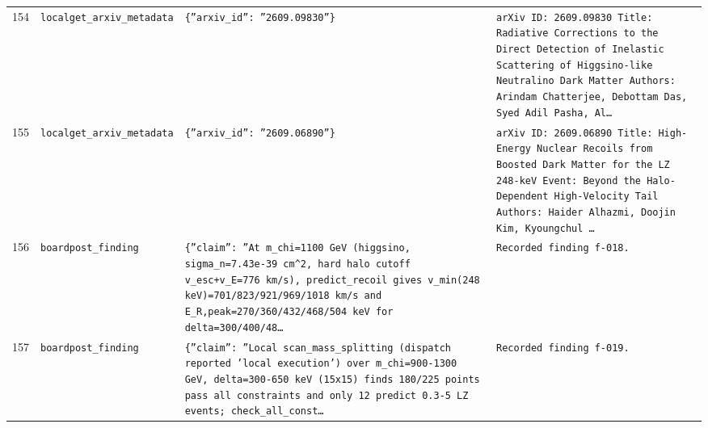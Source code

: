 \documentclass[11pt,a4paper]{article}
\begin{document}
\begin{longtable}{@{}p{}p{}p{}p{}@{}}
154 & \texttt{local}\newline\texttt{get\_\allowbreak{}arxiv\_\allowbreak{}metadata} & \texttt{\{''arxiv\_\allowbreak{}id'':\allowbreak{} ''2609.09830''\}\allowbreak{}} & \texttt{arXiv ID:\allowbreak{} 2609.09830 Title:\allowbreak{} Radiative Corrections to the Direct Detection of Inelastic Scattering of Higgsino-like Neutralino Dark Matter Authors:\allowbreak{} Arindam Chatterjee,\allowbreak{} Debottam Das,\allowbreak{} Syed Adil Pasha,\allowbreak{} Al\ldots{}\allowbreak{}} \\
155 & \texttt{local}\newline\texttt{get\_\allowbreak{}arxiv\_\allowbreak{}metadata} & \texttt{\{''arxiv\_\allowbreak{}id'':\allowbreak{} ''2609.06890''\}\allowbreak{}} & \texttt{arXiv ID:\allowbreak{} 2609.06890 Title:\allowbreak{} High-Energy Nuclear Recoils from Boosted Dark Matter for the LZ 248-keV Event:\allowbreak{} Beyond the Halo-Dependent High-Velocity Tail Authors:\allowbreak{} Haider Alhazmi,\allowbreak{} Doojin Kim,\allowbreak{} Kyoungchul \ldots{}\allowbreak{}} \\
156 & \texttt{board}\newline\texttt{post\_\allowbreak{}finding} & \texttt{\{''claim'':\allowbreak{} ''At m\_\allowbreak{}chi=\allowbreak{}1100 GeV (higgsino,\allowbreak{} sigma\_\allowbreak{}n=\allowbreak{}7.43e-39 cm\textasciicircum{}\allowbreak{}2,\allowbreak{} hard halo cutoff v\_\allowbreak{}esc+v\_\allowbreak{}E=\allowbreak{}776 km/\allowbreak{}s)\allowbreak{},\allowbreak{} predict\_\allowbreak{}recoil gives v\_\allowbreak{}min(248 keV)\allowbreak{}=\allowbreak{}701/\allowbreak{}823/\allowbreak{}921/\allowbreak{}969/\allowbreak{}1018 km/\allowbreak{}s and E\_\allowbreak{}R,\allowbreak{}peak=\allowbreak{}270/\allowbreak{}360/\allowbreak{}432/\allowbreak{}468/\allowbreak{}504 keV for delta=\allowbreak{}300/\allowbreak{}400/\allowbreak{}48\ldots{}\allowbreak{}} & \texttt{Recorded finding f-018.} \\
157 & \texttt{board}\newline\texttt{post\_\allowbreak{}finding} & \texttt{\{''claim'':\allowbreak{} ''Local scan\_\allowbreak{}mass\_\allowbreak{}splitting (dispatch reported 'local execution')\allowbreak{} over m\_\allowbreak{}chi=\allowbreak{}900-1300 GeV,\allowbreak{} delta=\allowbreak{}300-650 keV (15x15)\allowbreak{} finds 180/\allowbreak{}225 points pass all constraints and only 12 predict 0.3-5 LZ events;\allowbreak{} check\_\allowbreak{}all\_\allowbreak{}const\ldots{}\allowbreak{}} & \texttt{Recorded finding f-019.} \\

\end{longtable}
\end{document}
